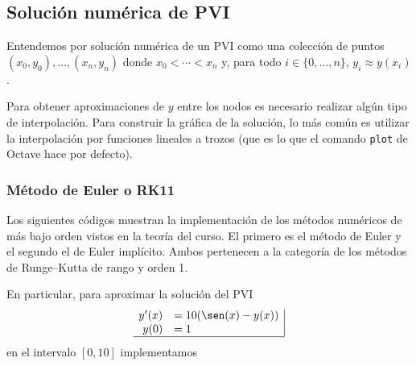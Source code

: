 \documentclass[letter,11pt]{article}
\newcommand{\octave}{{\sc Octave} }
\begin{document}
\subsection{Soluci\'on num\'erica de PVI}
Entendemos por soluci\'on num\'erica de un PVI como una colecci\'on de puntos $(x_0, y_0), \dotsc, (x_n,y_n)$ donde $x_0 < \dotsb < x_n$ y, para todo $i \in \{0, \dotsc, n\}$, $y_i \approx y(x_i)$.

Para obtener aproximaciones de $y$ entre los nodos es necesario realizar alg\'un tipo de interpolaci\'on.
Para construir la gr\'afica de la soluci\'on, lo m\'as com\'un es utilizar la interpolaci\'on por funciones lineales a trozos (que es lo que el comando \texttt{plot} de \octave hace por defecto).

\subsubsection{M\'etodo de Euler o RK11}
Los siguientes c\'odigos muestran la implementaci\'on de los m\'etodos num\'ericos de m\'as bajo orden vistos en la teor\'ia del curso. El primero es el m\'etodo de Euler y el segundo el de Euler impl\'icito. Ambos pertenecen a la categor\'ia de los m\'etodos de Runge--Kutta de rango y orden 1.

En particular, para aproximar la soluci\'on del PVI
$$
\begin{array}{rl|}
y'(x)	&=10(\sen(x)-y(x))\\
y(0)	&=1\\ \hline
\end{array}
$$
en el intervalo $[0,10]$ implementamos
\end{document}
